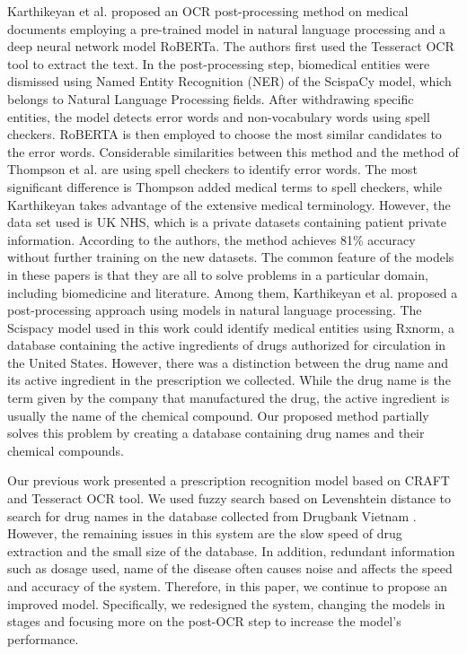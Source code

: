 Karthikeyan et al.\cite{karthikeyan2021ocr}  proposed an OCR post-processing method on medical documents employing a pre-trained model in natural language processing and a deep neural network model RoBERTa. The authors first used the Tesseract OCR tool to extract the text. In the post-processing step, biomedical entities were dismissed using Named Entity Recognition (NER) of the ScispaCy model, which belongs to Natural Language Processing fields. After withdrawing specific entities, the model detects error words and non-vocabulary words using spell checkers. RoBERTA is then employed to choose the most similar candidates to the error words. Considerable similarities between this method and the method of Thompson et al. \cite{thompson2015customised} are using spell checkers to identify error words. The most significant difference is Thompson added medical terms to spell checkers, while Karthikeyan takes advantage of the extensive medical terminology. However, the data set used is UK NHS, which is a private datasets containing patient private information. According to the authors, the method achieves 81\% accuracy without further training on the new datasets. The common feature of the models in these papers \cite{thompson2015customised, schulz2017multi, qader2019diagnosis, karthikeyan2021ocr} is that they are all to solve problems in a particular domain, including biomedicine and literature. Among them, Karthikeyan et al. proposed a post-processing approach using models in natural language processing. The Scispacy model used in this work \cite{karthikeyan2021ocr} could identify medical entities using Rxnorm, a database containing the active ingredients of drugs authorized for circulation in the United States. However, there was a distinction between the drug name and its active ingredient in the prescription we collected. While the drug name is the term given by the company that manufactured the drug, the active ingredient is usually the name of the chemical compound. Our proposed method partially solves this problem by creating a database containing drug names and their chemical compounds.

Our previous work \cite{nguyen2021developing} presented a prescription recognition model based on CRAFT and Tesseract OCR tool. We used fuzzy search based on Levenshtein distance to search for drug names in the database collected from Drugbank Vietnam \cite{drugbank}. However, the remaining issues in this system are the slow speed of drug extraction and the small size of the database. In addition, redundant information such as dosage used, name of the disease often causes noise and affects the speed and accuracy of the system. Therefore, in this paper, we continue to propose an improved model. Specifically, we redesigned the system, changing the models in stages and focusing more on the post-OCR step to increase the model's performance.
